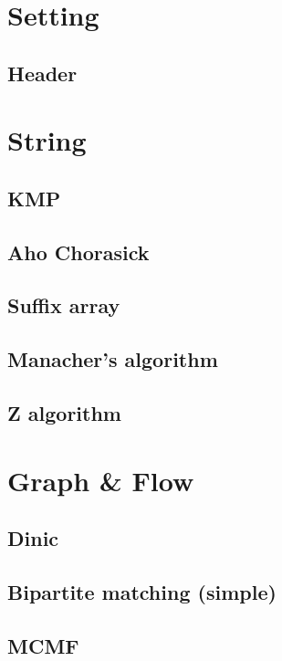 \documentclass[10pt,landscape,a4paper,twocolumn]{article}
\begin{document}
\tableofcontents

\section{Setting}
\subsection{Header}



\section{String}
\subsection{KMP}


\subsection{Aho Chorasick}


\subsection{Suffix array}


\subsection{Manacher's algorithm}


\subsection{Z algorithm}



\section{Graph & Flow}
\subsection{Dinic}
\lstinputlising{}

\subsection{Bipartite matching (simple)}
\lstinputlising{}

\subsection{MCMF}
\lstinputlising{}
\end{document}
